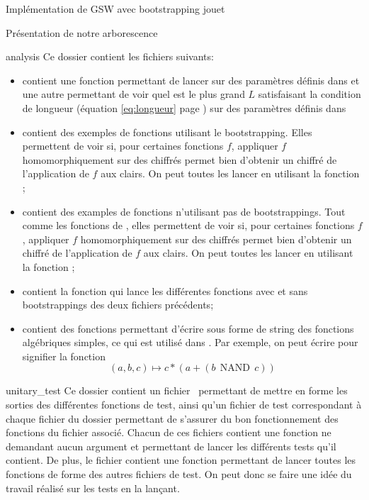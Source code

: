 \begin{section}{Implémentation de GSW avec bootstrapping \og{}jouet\fg~{}}
\begin{subsection}{Présentation de notre arborescence}
\begin{subsubsection}{analysis}
Ce dossier contient les fichiers suivants:
\begin{itemize}
\item {} contient une fonction permettant de lancer  sur des paramètres définis dans  et une autre permettant de voir quel est le plus grand $L$ satisfaisant la condition de longueur (équation \eqref{eq:longueur} page \pageref{eq:longueur}) sur des paramètres définis dans 
\item {} contient des exemples de fonctions utilisant le bootstrapping. Elles
permettent de voir si, pour certaines fonctions $f$, appliquer $f$ homomorphiquement sur des chiffrés permet bien d'obtenir un chiffré de l'application de $f$ aux clairs.  On peut toutes les lancer en  utilisant  la fonction
;
\item {} contient des examples de fonctions n'utilisant pas de bootstrappings.
Tout comme les fonctions de , elles permettent de voir si, pour certaines fonctions $f$, appliquer $f$
homomorphiquement sur des chiffrés permet bien d'obtenir un chiffré de l'application de $f$ aux clairs.  On peut toutes les lancer en  utilisant  la fonction ;
\item {} contient la fonction  qui lance les différentes fonctions avec
et sans bootstrappings des deux fichiers précédents;
\item {} contient des fonctions permettant d'écrire sous forme de string des fonctions algébriques
simples, ce qui est utilisé dans  . Par exemple, on peut écrire
 pour signifier la fonction \[(a,b,c) \mapsto c * (a + (b\:\: \text{NAND}\:\: c)) \]
\end{itemize}
\end{subsubsection} %

\begin{subsubsection}{unitary\_test}
Ce dossier contient un fichier  permettant de mettre en forme les sorties des différentes
fonctions de test, ainsi qu'un fichier de test correspondant à chaque fichier du dossier  permettant de s'assurer du bon fonctionnement des fonctions du fichier associé.  Chacun de ces
fichiers contient une fonction  ne demandant aucun argument et permettant de lancer les différents
tests qu'il contient. De plus, le fichier  contient une fonction  permettant de
lancer toutes les fonctions de forme  des autres fichiers de test.  On peut donc se faire une idée
du travail réalisé sur les tests en la lançant.
\end{subsubsection} %
\end{subsection}
\end{section}
